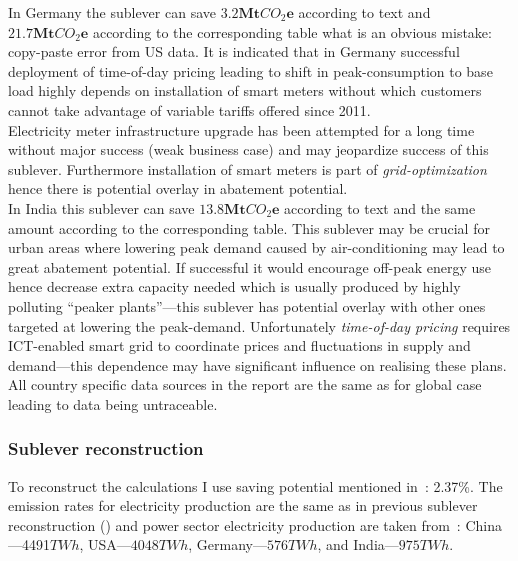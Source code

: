 \documentclass[11pt, twocolumn]{article}
\begin{document}
In Germany the sublever can save $\mathbf{3.2} \mathbf{Mt}CO_2\mathbf{e}$ according to text and $\mathbf{21.7} \mathbf{Mt}CO_2\mathbf{e}$ according to the corresponding table what is an obvious mistake: copy-paste error from US data. It is indicated that in Germany successful deployment of time-of-day pricing leading to shift in peak-consumption to base load highly depends on installation of smart meters without which customers cannot take advantage of variable tariffs offered since 2011.\\
Electricity meter infrastructure upgrade has been attempted for a long time without major success (weak business case) and may jeopardize success of this sublever. Furthermore installation of smart meters is part of \emph{grid-optimization} hence there is potential overlay in abatement potential.\\

In India this sublever can save $\mathbf{13.8} \mathbf{Mt}CO_2\mathbf{e}$ according to text and the same amount according to the corresponding table. This sublever may be crucial for urban areas where lowering peak demand caused by air-conditioning may lead to great abatement potential. If successful it would encourage off-peak energy use hence decrease extra capacity needed which is usually produced by highly polluting ``peaker plants''---this sublever has potential overlay with other ones targeted at lowering the peak-demand. Unfortunately \emph{time-of-day pricing} requires ICT-enabled smart grid to coordinate prices and fluctuations in supply and demand---this dependence may have significant influence on realising these plans.\\

All country specific data sources in the report are the same as for global case leading to data being untraceable.

\subsubsection{Sublever reconstruction\label{sec:todp:reconstruction}}
To reconstruct the calculations I use saving potential mentioned in~\citep{faruqui2005quantifying}: 2.37\%. The emission rates for electricity production are the same as in previous sublever reconstruction (\citep{iea2012co2}) and power sector electricity production are taken from~\citep{eia2011}: China---4491$TWh$, USA---$4048TWh$, Germany---$576TWh$, and India---$975TWh$.\\
\end{document}
